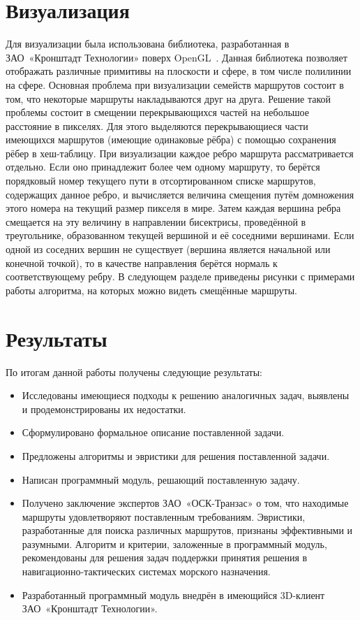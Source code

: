 \FloatBarrier

\section{Визуализация}

Для визуализации была использована библиотека, разработанная в
ЗАО~«Кронштадт Технологии» поверх OpenGL~\cite{opengl}. Данная
библиотека позволяет отображать различные примитивы на плоскости и
сфере, в том числе полилинии на сфере. Основная проблема при
визуализации семейств маршрутов состоит в том, что некоторые маршруты
накладываются друг на друга. Решение такой проблемы состоит в смещении
перекрывающихся частей на небольшое расстояние в пикселях. Для этого
выделяются перекрывающиеся части имеющихся маршрутов (имеющие
одинаковые рёбра) с помощью сохранения рёбер в хеш-таблицу. При
визуализации каждое ребро маршрута рассматривается отдельно. Если оно
принадлежит более чем одному маршруту, то берётся порядковый номер
текущего пути в отсортированном списке маршрутов, содержащих данное
ребро, и вычисляется величина смещения путём домножения этого номера
на текущий размер пикселя в мире. Затем каждая вершина ребра смещается
на эту величину в направлении бисектрисы, проведённой в треугольнике,
образованном текущей вершиной и её соседними вершинами. Если одной из
соседних вершин не существует (вершина является начальной или конечной
точкой), то в качестве направления берётся нормаль к соответствующему
ребру. В следующем разделе приведены рисунки с примерами работы
алгоритма, на которых можно видеть смещённые маршруты.

\FloatBarrier

\section{Результаты}

По итогам данной работы получены следующие результаты:
\begin{itemize}
    \item Исследованы имеющиеся подходы к решению аналогичных задач,
      выявлены и продемонстрированы их недостатки.
    \item Сформулировано формальное описание поставленной задачи.
    \item Предложены алгоритмы и эвристики для решения поставленной
      задачи.
    \item Написан программный модуль, решающий поставленную задачу.
    \item Получено заключение экспертов ЗАО~«ОСК-Транзас» о том, что
      находимые маршруты удовлетворяют поставленным требованиям.
      Эвристики, разработанные для поиска различных маршрутов,
      признаны эффективными и разумными. Алгоритм и критерии,
      заложенные в программный модуль, рекомендованы для решения задач
      поддержки принятия решения в навигационно-тактических системах
      морского назначения.
    \item Разработанный программный модуль внедрён в имеющийся
      3D-клиент ЗАО~«Кронштадт Технологии».
\end{itemize}

